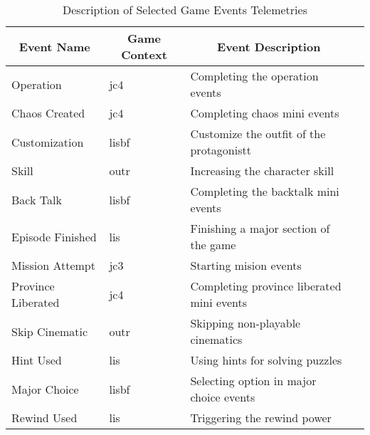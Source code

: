 \begin{table}[H] \centering
\caption{Description of Selected Game Events Telemetries}
\label{metricsdescription_event_3}
  \begin{tabularx}{\textwidth}{@{}lllX@{}}
\hline
\multicolumn{1}{c}{\textbf{Event Name}} & \multicolumn{1}{c}{\textbf{Game Context}} & \multicolumn{1}{c}{\textbf{Event Description}}                   \\ \hline
Operation                               & jc4                                       & Completing the operation events                                  \\
Chaos Created                           & jc4                                       & Completing chaos mini events                                     \\
Customization                           & lisbf                                     & Customize the outfit of the protagonistt                         \\
Skill                                   & outr                                      & Increasing the character skill                                   \\
Back Talk                               & lisbf                                     & Completing the backtalk mini events                              \\
Episode Finished                        & lis                                       & Finishing a major section of the game                            \\
Mission Attempt                         & jc3                                       & Starting mision events                                           \\
Province Liberated                      & jc4                                       & Completing province liberated mini events                        \\
Skip Cinematic                          & outr                                      & Skipping non-playable cinematics                                 \\
Hint Used                               & lis                                       & Using hints for solving puzzles                                  \\
Major Choice                            & lisbf                                     & Selecting option in major choice events                          \\
Rewind Used                             & lis                                       & Triggering the rewind power                                      \\

\end{tabularx}
\end{table}
